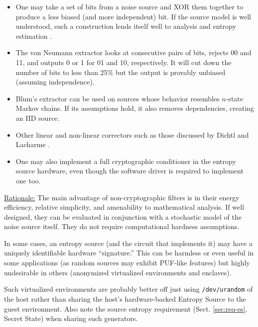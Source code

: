     \begin{itemize}
    \item   One may take a set of bits from a noise source and XOR them
            together to produce a less biased (and more independent) bit.
            If the source model is well understood, such a construction
            lends itself well to analysis and entropy estimation \cite{Da02}.
    \item   The von Neumann extractor \cite{Ne51} looks at consecutive
            pairs of bits, rejects 00 and 11, and outputs 0 or 1 for
            01 and 10, respectively. It will cut down the number of bits to
            less than 25\% but the output is provably unbiased (assuming
            independence).
    \item   Blum's extractor \cite{Bl86} can be used on sources
            whose behavior resembles $n$-state Markov chains. If its
            assumptions hold, it also removes dependencies, creating an IID
            source.
    \item   Other linear and non-linear correctors such as those
            discussed by Dichtl and Lacharme \cite{La08}.
    \item   One may also implement a full cryptographic conditioner
            in the entropy source hardware, even though the software driver
            is required to implement one too.
    \end{itemize}

    \underline{Rationale:}
    The main advantage of non-cryptographic filters is in their
    energy efficiency, relative simplicity, and amenability to mathematical
    analysis. If well designed, they can be evaluated in
    conjunction with a stochastic model of the noise source itself.
    They do not require computational hardness assumptions.

    In some cases, an entropy source (and the circuit that implements it)
    may have a uniquely identifiable hardware ``signature.'' This can be
    harmless or even useful in some applications (as random sources may
    exhibit PUF-like features) but highly undesirable in others (anonymized
    virtualized environments and enclaves).

    Such virtualized environments are probably better off just using
    \verb|/dev/urandom| of the host rather than sharing the host's
    hardware-backed Entropy Source to the guest environment. Also note the
    source entropy requirement (Sect. \ref{sec:req-es}, Secret State)
    when sharing such generators.

